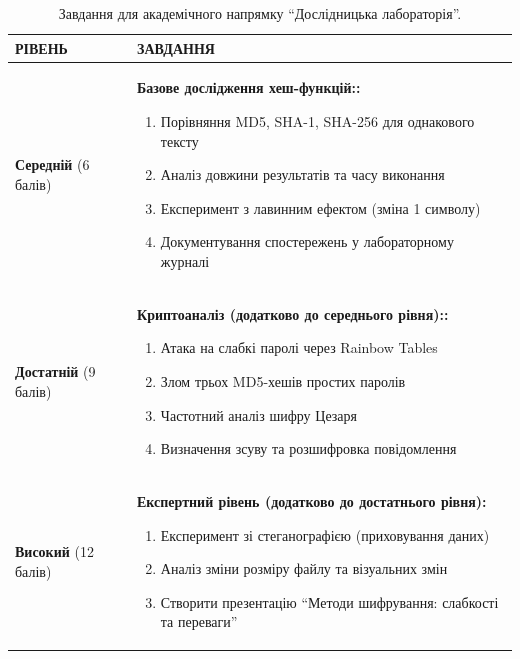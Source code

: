 \begin{table}[h!]
\caption{Завдання для академічного напрямку ``Дослідницька лабораторія''.}
\label{tab:lab2_acad_task} %
\noindent %


\begin{tabular}{
  | >{\raggedright\arraybackslash}p{} 
  | >{\raggedright\arraybackslash}p{} |
}
\hline

\rowcolor{TableHeaderBlue}
\hfil \color{white}\textbf{РІВЕНЬ} & 
\hfil \color{white}\textbf{ЗАВДАННЯ} \\ \hline

\textbf{Середній} (6 балів) &
\textbf{Базове дослідження хеш-функцій::}
\begin{enumerate}
    \item Порівняння MD5, SHA-1, SHA-256 для однакового тексту
    \item Аналіз довжини результатів та часу виконання
    \item Експеримент з лавинним ефектом (зміна 1 символу)
    \item Документування спостережень у лабораторному журналі
\end{enumerate} \\ \hline

\textbf{Достатній} (9 балів)&
\textbf{Криптоаналіз (додатково до середнього рівня)::}
\begin{enumerate}
    \item  Атака на слабкі паролі через Rainbow Tables
    \item Злом трьох MD5-хешів простих паролів
    \item Частотний аналіз шифру Цезаря
    \item Визначення зсуву та розшифровка повідомлення
\end{enumerate} \\ \hline

\textbf{Високий} (12 балів)&
\textbf{Експертний рівень (додатково до достатнього рівня):}
\begin{enumerate}
    \item Експеримент зі стеганографією (приховування даних)
    \item Аналіз зміни розміру файлу та візуальних змін
    \item Створити презентацію ``Методи шифрування: слабкості та переваги''
\end{enumerate} \\ \hline
\end{tabular}
\end{table}

